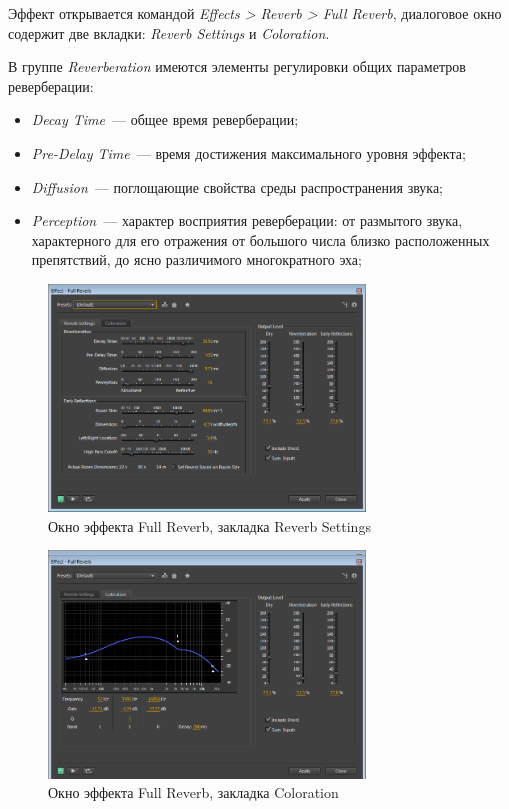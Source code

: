\documentclass[oneside, final, 14pt]{extreport}
\begin{document}
Эффект открывается командой \emph{Effects > Reverb > Full Reverb}, диалоговое окно содержит две вкладки: \emph{Reverb Settings} и \emph{Coloration}.

В группе \emph{Reverberation} имеются элементы регулировки общих параметров реверберации:
\begin{itemize}
  \item \emph{Decay Time}~--- общее время реверберации;
  \item \emph{Pre-Delay Time}~--- время достижения максимального уровня эффекта;
  \item \emph{Diffusion}~--- поглощающие свойства среды распространения звука;
  \item \emph{Perception}~--- характер восприятия реверберации: от размытого звука, характерного для его отражения от большого числа близко расположенных препятствий, до ясно различимого многократного эха;
\end{itemize}

\begin{figure}[h!]
  \centering
  \includegraphics[width=0.75\textwidth]{pic-aureverb-01}
  \caption{Окно эффекта Full Reverb, закладка Reverb Settings}
  \label{pic-aureverb-01}
\end{figure}

\begin{figure}[h!]
  \centering
  \includegraphics[width=0.75\textwidth]{pic-aureverb-02}
  \caption{Окно эффекта Full Reverb, закладка Coloration}
  \label{pic-aureverb-01}
\end{figure}
\end{document}
